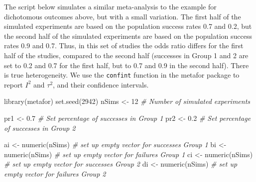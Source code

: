 \documentclass[
  oneside]{krantz}
\makeatletter
\newenvironment{Shaded}{\begin{snugshade}}{\end{snugshade}}
\newcommand{\CommentTok}[1]{\textcolor[rgb]{0.37,0.37,0.37}{\textit{#1}}}
\newcommand{\DecValTok}[1]{\textcolor[rgb]{0.06,0.06,0.06}{#1}}
\newcommand{\FloatTok}[1]{\textcolor[rgb]{0.06,0.06,0.06}{#1}}
\newcommand{\FunctionTok}[1]{\textcolor[rgb]{0,0,0}{#1}}
\newcommand{\NormalTok}[1]{#1}
\newcommand{\OtherTok}[1]{\textcolor[rgb]{0.37,0.37,0.37}{#1}}
\newenvironment{kframe}{%
\medskip{}
\setlength{\fboxsep}{.8em}
 \def\at@end@of@kframe{}%
 \ifinner\ifhmode%
  \def\at@end@of@kframe{\end{minipage}}%
  \begin{minipage}{\columnwidth}%
 \fi\fi%
 \def\FrameCommand##1{\hskip\@totalleftmargin \hskip-\fboxsep
 \colorbox{shadecolor}{##1}\hskip-\fboxsep
     \hskip-\linewidth \hskip-\@totalleftmargin \hskip\columnwidth}%
 \MakeFramed {\advance\hsize-\width
   \@totalleftmargin\z@ \linewidth\hsize
   \@setminipage}}%
 {\par\unskip\endMakeFramed%
 \at@end@of@kframe}
\renewenvironment{Shaded}{\begin{kframe}}{\end{kframe}}
\makeatother
\begin{document}
The script below simulates a similar meta-analysis to the example for dichotomous outcomes above, but with a small variation. The first half of the simulated experiments are based on the population success rates 0.7 and 0.2, but the second half of the simulated experiments are based on the population success rates 0.9 and 0.7. Thus, in this set of studies the odds ratio differs for the first half of the studies, compared to the second half (successes in Group 1 and 2 are set to 0.2 and 0.7 for the first half, but to 0.7 and 0.9 in the second half). There is true heterogeneity. We use the \texttt{confint} function in the metafor package to report \(I^2\) and \(\tau^2\), and their confidence intervals.

\begin{Shaded}
\begin{Highlighting}[]
\FunctionTok{library}\NormalTok{(metafor)}
\FunctionTok{set.seed}\NormalTok{(}\DecValTok{2942}\NormalTok{)}
\NormalTok{nSims }\OtherTok{\textless{}{-}} \DecValTok{12} \CommentTok{\# Number of simulated experiments}

\NormalTok{pr1 }\OtherTok{\textless{}{-}} \FloatTok{0.7} \CommentTok{\# Set percentage of successes in Group 1}
\NormalTok{pr2 }\OtherTok{\textless{}{-}} \FloatTok{0.2} \CommentTok{\# Set percentage of successes in Group 2}

\NormalTok{ai }\OtherTok{\textless{}{-}} \FunctionTok{numeric}\NormalTok{(nSims) }\CommentTok{\# set up empty vector for successes Group 1}
\NormalTok{bi }\OtherTok{\textless{}{-}} \FunctionTok{numeric}\NormalTok{(nSims) }\CommentTok{\# set up empty vector for failures Group 1}
\NormalTok{ci }\OtherTok{\textless{}{-}} \FunctionTok{numeric}\NormalTok{(nSims) }\CommentTok{\# set up empty vector for successes Group 2}
\NormalTok{di }\OtherTok{\textless{}{-}} \FunctionTok{numeric}\NormalTok{(nSims) }\CommentTok{\# set up empty vector for failures Group 2}


\end{Highlighting}
\end{Shaded}
\end{document}
